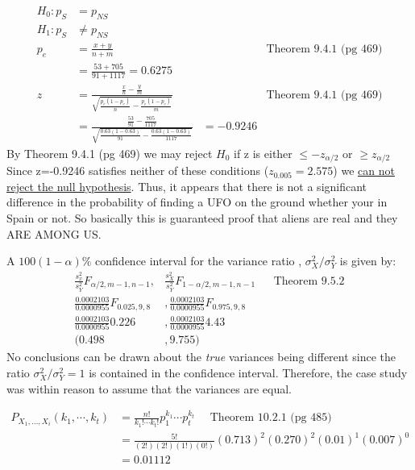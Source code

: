 \documentclass[12pt]{article}
\newenvironment{problem}[2][Problem]{\begin{trivlist}
\item[\hskip \labelsep {\bfseries #1}\hskip \labelsep {\bfseries #2.}]}{\end{trivlist}}
\begin{document}
\begin{problem}{9.4.4} 
\begin{align*}
H_0: p_S &= p_{NS} \\
H_1: p_S &\neq p_{NS} \\ 
p_e &= \frac{x+y}{n+m} && \text{Theorem 9.4.1 (pg 469)} \\
&= \frac{53+705}{91+1117} = 0.6275 \\
z &= \frac{\frac{x}{n} - \frac{y}{m}}{\sqrt{\frac{p_e(1-p_e)}{n}-\frac{p_e(1-p_e)}{m}}} && \text{Theorem 9.4.1 (pg 469)} \\
&= \frac{\frac{53}{91} - \frac{705}{1117}}{\sqrt{\frac{0.63(1-0.63)}{91}-\frac{0.63(1-0.63)}{1117}}}
&= -0.9246
\end{align*}
By Theorem 9.4.1 (pg 469) we may reject $H_0$ if z is either $\leq -z_{\alpha /2}$ or $\geq z_{\alpha /2}$ Since z=-0.9246 satisfies neither of these conditions ($z_{0.005} = 2.575$) we \underline{can not reject the null hypothesis}. Thus, it appears that there is not a significant difference in the probability of finding a UFO on the ground whether your in Spain or not. So basically this is guaranteed proof that aliens are real and they ARE AMONG US. 

\end{problem}
\newpage

\begin{problem}{9.5.6} A $100(1-\alpha )\% $ confidence interval for the variance ratio , $\sigma^2_X / \sigma^2_Y$ is given by: 
\begin{align*}
\frac{s_x^2}{s_Y^2}F_{\alpha /2,m-1,n-1},& \frac{s_X^2}{s_Y^2}F_{1-\alpha /2,m-1,n-1} && \text{Theorem 9.5.2} \\
\frac{0.0002103}{0.0000955}F_{0.025,9,8} &, \frac{0.0002103}{0.0000955}F_{0.975,9,8} \\ 
\frac{0.0002103}{0.0000955}0.226 &, \frac{0.0002103}{0.0000955}4.43 \\ 
(0.498&, 9.755)
\end{align*}
No conclusions can be drawn about the \textit{true} variances being different since the ratio $\sigma^2_X/\sigma^2_Y =1$ is contained in the confidence interval. Therefore, the case study was within reason to assume that the variances are equal. 
\end{problem}

\begin{problem}{10.2.6} 
\begin{align*}
P_{X_1,...,X_i}(k_1,\cdots ,k_t)&= \frac{n!}{k_1!\cdots k_t!}p_1^{k_1}\cdots p_t^{k_t} \ \ \ \ \ \  \text{Theorem 10.2.1 (pg 485)} \\ 
&= \frac{5!}{(2!)(2!)(1!)(0!)}(0.713)^2(0.270)^2(0.01)^1(0.007)^0 \\ 
&=  0.01112
\end{align*}
\end{problem}
\end{document}
